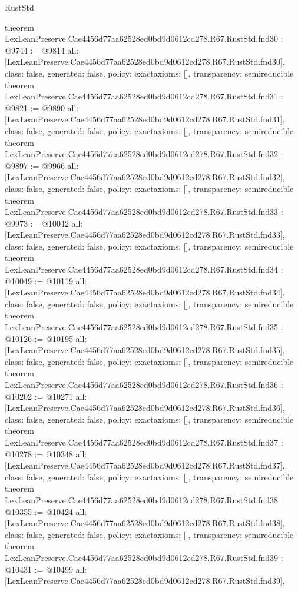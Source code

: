 \begin{lexlean}{RustStd}
\begin{coremodule}
{}
theorem LexLeanPreserve.Cae4456d77aa62528ed0bd9d0612cd278.R67.RustStd.fnd30 : @9744 := @9814 {
  all: [LexLeanPreserve.Cae4456d77aa62528ed0bd9d0612cd278.R67.RustStd.fnd30],
  class: false,
  generated: false,
  policy: exact{axioms: []},
  transparency: semireducible
}
theorem LexLeanPreserve.Cae4456d77aa62528ed0bd9d0612cd278.R67.RustStd.fnd31 : @9821 := @9890 {
  all: [LexLeanPreserve.Cae4456d77aa62528ed0bd9d0612cd278.R67.RustStd.fnd31],
  class: false,
  generated: false,
  policy: exact{axioms: []},
  transparency: semireducible
}
theorem LexLeanPreserve.Cae4456d77aa62528ed0bd9d0612cd278.R67.RustStd.fnd32 : @9897 := @9966 {
  all: [LexLeanPreserve.Cae4456d77aa62528ed0bd9d0612cd278.R67.RustStd.fnd32],
  class: false,
  generated: false,
  policy: exact{axioms: []},
  transparency: semireducible
}
theorem LexLeanPreserve.Cae4456d77aa62528ed0bd9d0612cd278.R67.RustStd.fnd33 : @9973 := @10042 {
  all: [LexLeanPreserve.Cae4456d77aa62528ed0bd9d0612cd278.R67.RustStd.fnd33],
  class: false,
  generated: false,
  policy: exact{axioms: []},
  transparency: semireducible
}
theorem LexLeanPreserve.Cae4456d77aa62528ed0bd9d0612cd278.R67.RustStd.fnd34 : @10049 := @10119 {
  all: [LexLeanPreserve.Cae4456d77aa62528ed0bd9d0612cd278.R67.RustStd.fnd34],
  class: false,
  generated: false,
  policy: exact{axioms: []},
  transparency: semireducible
}
theorem LexLeanPreserve.Cae4456d77aa62528ed0bd9d0612cd278.R67.RustStd.fnd35 : @10126 := @10195 {
  all: [LexLeanPreserve.Cae4456d77aa62528ed0bd9d0612cd278.R67.RustStd.fnd35],
  class: false,
  generated: false,
  policy: exact{axioms: []},
  transparency: semireducible
}
theorem LexLeanPreserve.Cae4456d77aa62528ed0bd9d0612cd278.R67.RustStd.fnd36 : @10202 := @10271 {
  all: [LexLeanPreserve.Cae4456d77aa62528ed0bd9d0612cd278.R67.RustStd.fnd36],
  class: false,
  generated: false,
  policy: exact{axioms: []},
  transparency: semireducible
}
theorem LexLeanPreserve.Cae4456d77aa62528ed0bd9d0612cd278.R67.RustStd.fnd37 : @10278 := @10348 {
  all: [LexLeanPreserve.Cae4456d77aa62528ed0bd9d0612cd278.R67.RustStd.fnd37],
  class: false,
  generated: false,
  policy: exact{axioms: []},
  transparency: semireducible
}
theorem LexLeanPreserve.Cae4456d77aa62528ed0bd9d0612cd278.R67.RustStd.fnd38 : @10355 := @10424 {
  all: [LexLeanPreserve.Cae4456d77aa62528ed0bd9d0612cd278.R67.RustStd.fnd38],
  class: false,
  generated: false,
  policy: exact{axioms: []},
  transparency: semireducible
}
theorem LexLeanPreserve.Cae4456d77aa62528ed0bd9d0612cd278.R67.RustStd.fnd39 : @10431 := @10499 {
  all: [LexLeanPreserve.Cae4456d77aa62528ed0bd9d0612cd278.R67.RustStd.fnd39],
}
\end{coremodule}
\end{lexlean}
